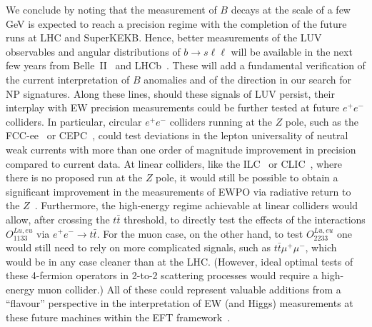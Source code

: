 We conclude by noting that the measurement of $B$ decays at the scale of a few GeV is expected to reach a precision regime with the completion of the future runs at LHC and SuperKEKB. Hence, better measurements of the LUV observables and angular distributions of $b\to s \ell \ell$ will be available in the next few years from Belle~II~\cite{Kou:2018nap} and LHCb~\cite{Bediaga:2018lhg}. These will add a fundamental verification of the current interpretation of $B$ anomalies and of the direction in our search for NP signatures. 
%
Along these lines, should these signals of LUV persist, their interplay with EW precision measurements could be further tested at future $e^+ e^-$ colliders. In particular, circular $e^+ e^-$ colliders running at the $Z$ pole, such as the FCC-ee~\cite{Abada:2019lih,Abada:2019zxq} or CEPC~\cite{CEPCStudyGroup:2018ghi}, could test deviations in the lepton universality of neutral weak currents with more than one order of magnitude improvement in precision compared to current data. At linear colliders, like the ILC~\cite{Bambade:2019fyw} or CLIC~\cite{deBlas:2018mhx}, where there is no proposed run at the $Z$ pole, it would still be possible to obtain a significant improvement in the measurements of EWPO via radiative return to the $Z$~\cite{Fujii:2019zll}. 
%
Furthermore, the high-energy regime achievable at linear colliders would allow, after crossing the $t\bar{t}$ threshold, to directly test the effects of the interactions $O^{Lu,eu}_{1133}$ via $e^+ e^- \to t\bar{t}$. 
For the muon case, on the other hand, to test $O^{Lu,eu}_{2233}$ one would still need to rely on more complicated signals, such as $t\bar{t}\mu^+\mu^-$, which would be in any case cleaner than at the LHC. (However, ideal optimal tests of these 4-fermion operators in 2-to-2 scattering processes would require a high-energy muon collider.) All of these could represent valuable additions from a ``flavour'' perspective in the interpretation of EW (and Higgs) measurements at these future machines within the EFT framework~\cite{deBlas:2019rxi,deBlas:2019wgy}.

